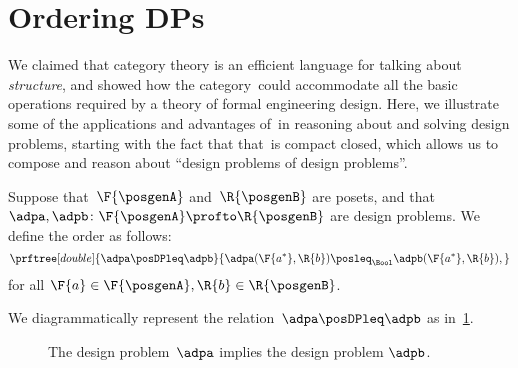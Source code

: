 

\section{Ordering DPs}\label{sec:ordering-order}
We claimed that category theory is an efficient language for talking about \emph{structure}, and showed how the category~\DP could accommodate all the basic operations required by a theory of formal engineering design.
Here, we illustrate some of the applications and advantages of~\DP in reasoning about and solving design problems, starting with the fact that that~\DP is compact closed, which allows us to compose and reason about ``design problems of design problems''.


\begin{definition}[Order on~\DP]
    \label{def:DP_loc_pos}
    Suppose that~$\F{\posgenA}$ and~$\R{\posgenB}$ are posets, and that~$\adpa,\adpb \colon \F{\posgenA} \profto \R{\posgenB}$ are design problems.
    We define the order as follows:
    \begin{equation*}
        \prftree[double]{
            \adpa \posDPleq \adpb
        }{
            \adpa(\F{a^*},\R{b}) \posleq_\Bool \adpb(\F{a^*},\R{b}),
        }
    \end{equation*}
    for all $\F{a} \in \F{\posgenA},\R{b} \in \R{\posgenB}$.
\end{definition}

We diagrammatically represent the relation~$\adpa \posDPleq \adpb$ as in~\cref{fig:dpimplies}.



\begin{figure}[h!]
    \centering
    \caption{The design problem~$\adpa$ implies the design problem $\adpb$.}
    \label{fig:dpimplies}
\end{figure}


